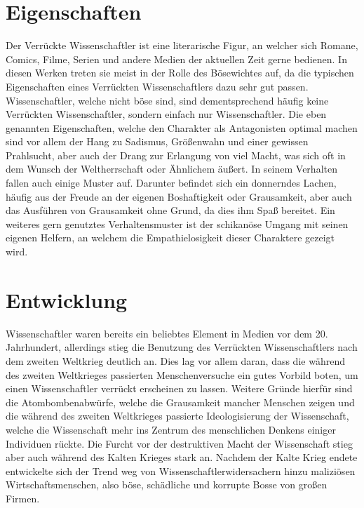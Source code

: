\documentclass[12pt]{scrreprt}
\begin{document}
\section{Eigenschaften}
	\label{sec:eigenschaften}
Der Verrückte Wissenschaftler ist eine literarische Figur, an welcher sich Romane, Comics, Filme, Serien und andere Medien der aktuellen Zeit gerne bedienen.
In diesen Werken treten sie meist in der Rolle des Bösewichtes auf, da die typischen Eigenschaften eines Verrückten Wissenschaftlers dazu sehr gut passen.
Wissenschaftler, welche nicht böse sind, sind dementsprechend häufig keine Verrückten Wissenschaftler, sondern einfach nur Wissenschaftler. 
Die eben genannten Eigenschaften, welche den Charakter als Antagonisten optimal machen sind vor allem der Hang zu Sadismus, Größenwahn und einer gewissen Prahlsucht, aber auch der Drang zur Erlangung von viel Macht, was sich oft in dem Wunsch der Weltherrschaft oder Ähnlichem äußert.
In seinem Verhalten fallen auch einige Muster auf.
Darunter befindet sich ein donnerndes Lachen, häufig aus der Freude an der eigenen Boshaftigkeit oder Grausamkeit, aber auch das Ausführen von Grausamkeit ohne Grund, da dies ihm Spaß bereitet.
Ein weiteres gern genutztes Verhaltensmuster ist der schikanöse Umgang mit seinen eigenen Helfern, an welchem die Empathielosigkeit dieser Charaktere gezeigt wird.
\autocite{wiki:Verrückter_Wissenschaftler}
\section{Entwicklung}
	\label{sec:entwicklung}
Wissenschaftler waren bereits ein beliebtes Element in Medien vor dem 20. Jahrhundert, allerdings stieg die Benutzung des Verrückten Wissenschaftlers nach dem zweiten Weltkrieg deutlich an.
Dies lag vor allem daran, dass die während des zweiten Weltkrieges passierten Menschenversuche ein gutes Vorbild boten, um einen Wissenschaftler verrückt erscheinen zu lassen.
Weitere Gründe hierfür sind die Atombombenabwürfe, welche die Grausamkeit mancher Menschen zeigen und die während des zweiten Weltkrieges passierte Ideologisierung der Wissenschaft, welche die Wissenschaft mehr ins Zentrum des menschlichen Denkens einiger Individuen rückte.
Die Furcht vor der destruktiven Macht der Wissenschaft stieg aber auch während des Kalten Krieges stark an.
Nachdem der Kalte Krieg endete entwickelte sich der Trend weg von Wissenschaftlerwidersachern hinzu maliziösen Wirtschaftsmenschen, also böse, schädliche und korrupte Bosse von großen Firmen.
\autocite{wiki:Verrückter_Wissenschaftler}
\end{document}
